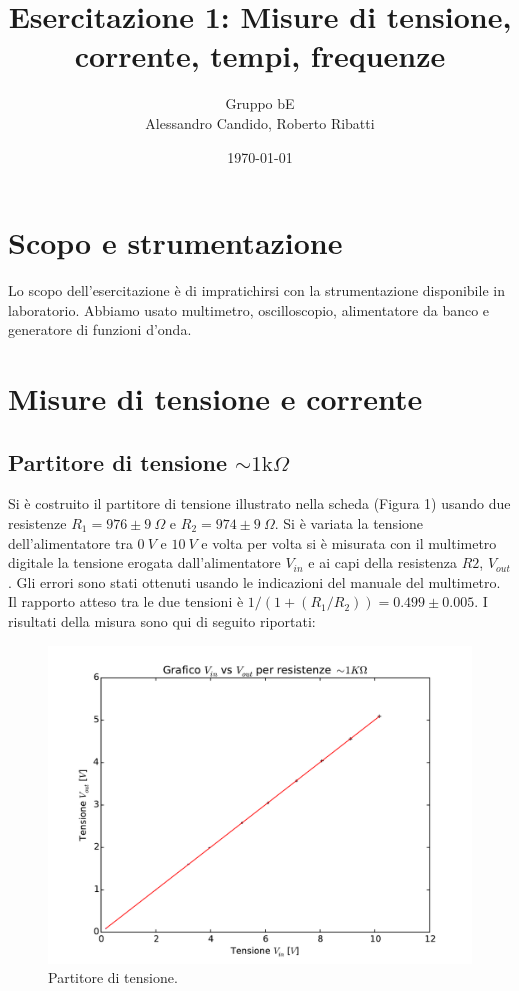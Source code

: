 \documentclass[10pt,a4paper]{article}
\title{Esercitazione 1: Misure di tensione, corrente, tempi, frequenze}
\author{Gruppo bE \\ Alessandro Candido, Roberto Ribatti}
\date{\today}
\begin{document}
\maketitle

\section{Scopo e strumentazione}
Lo scopo dell'esercitazione è di impratichirsi con la strumentazione disponibile in laboratorio. Abbiamo usato multimetro, oscilloscopio, alimentatore da banco e generatore di funzioni d'onda.

\section{Misure di tensione e corrente}

\subsection{Partitore di tensione $\sim1\text{k}\Omega$}
Si è costruito il partitore di tensione illustrato nella scheda (Figura 1) usando due resistenze $R_1 = 976 \pm 9~\Omega$ e $R_2 = 974 \pm 9 ~\Omega$.
Si è variata la tensione dell'alimentatore tra $0~V$ e $10~V$ e volta per volta si è misurata con il multimetro digitale la tensione erogata dall'alimentatore $V_{in}$ e ai capi della resistenza $R2$, $V_{out}$. Gli errori sono stati ottenuti usando le indicazioni del manuale del multimetro.
Il rapporto atteso tra le due tensioni è $1/(1+(R_1/R_2))=0.499 \pm 0.005$. 
I risultati della misura sono qui di seguito riportati:


\begin{figure}[h]
	\centering
	\includegraphics[scale=0.6]{../grafici/fit_1KOhm.pdf}
	\caption{Partitore di tensione.}
	\label{f:par1}
\end{figure}
\end{document}
